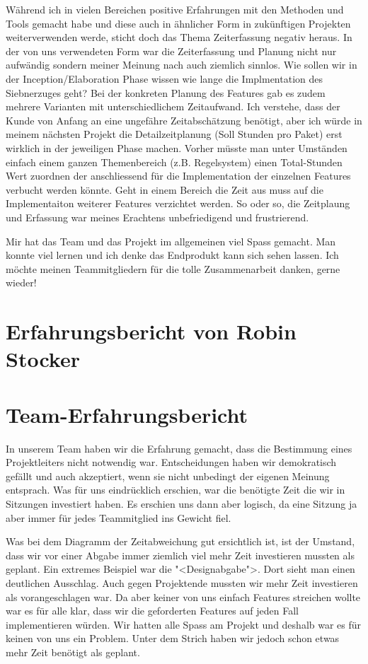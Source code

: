 \documentclass[12pt,halfparskip]{scrartcl}
\begin{document}
Während ich in vielen Bereichen positive Erfahrungen mit den Methoden und Tools gemacht habe und diese auch in ähnlicher Form in zukünftigen Projekten weiterverwenden werde, sticht doch das Thema Zeiterfassung negativ heraus. In der von uns verwendeten Form war die Zeiterfassung und Planung nicht nur aufwändig sondern meiner Meinung nach auch ziemlich sinnlos. Wie sollen wir in der Inception/Elaboration Phase wissen wie lange die Implmentation des Siebnerzuges geht? Bei der konkreten Planung des Features gab es zudem mehrere Varianten mit unterschiedlichem Zeitaufwand. Ich verstehe, dass der Kunde von Anfang an eine ungefähre Zeitabschätzung benötigt, aber ich würde in meinem nächsten Projekt die Detailzeitplanung (Soll Stunden pro Paket) erst wirklich in der jeweiligen Phase machen. Vorher müsste man unter Umständen einfach einem ganzen Themenbereich (z.B. Regelsystem) einen Total-Stunden Wert zuordnen der anschliessend für die Implementation der einzelnen Features verbucht werden könnte. Geht in einem Bereich die Zeit aus muss auf die Implementaiton weiterer Features verzichtet werden. So oder so, die Zeitplaung und Erfassung war meines Erachtens unbefriedigend und frustrierend.

Mir hat das Team und das Projekt im allgemeinen viel Spass gemacht. Man konnte viel lernen und ich denke das Endprodukt kann sich sehen lassen. Ich möchte meinen Teammitgliedern für die tolle Zusammenarbeit danken, gerne wieder!

\section{Erfahrungsbericht von Robin Stocker}

\section{Team-Erfahrungsbericht}
In unserem Team haben wir die Erfahrung gemacht, dass die Bestimmung eines Projektleiters nicht notwendig war. Entscheidungen haben wir demokratisch gefällt und auch akzeptiert, wenn sie nicht unbedingt der eigenen Meinung entsprach. Was für uns eindrücklich erschien, war die benötigte Zeit die wir in Sitzungen investiert haben. Es erschien uns dann aber logisch, da eine Sitzung ja aber immer für jedes Teammitglied ins Gewicht fiel.

Was bei dem Diagramm der Zeitabweichung gut ersichtlich ist, ist der Umstand, dass wir vor einer Abgabe immer ziemlich viel mehr Zeit investieren mussten als geplant. Ein extremes Beispiel war die "<Designabgabe">. Dort sieht man einen deutlichen Ausschlag. Auch gegen Projektende mussten wir mehr Zeit investieren als vorangeschlagen war. Da aber keiner von uns einfach Features streichen wollte war es für alle klar, dass wir die geforderten Features auf jeden Fall implementieren würden. Wir hatten alle Spass am Projekt und deshalb war es für keinen von uns ein Problem. Unter dem Strich haben wir jedoch schon etwas mehr Zeit benötigt als geplant.
\end{document}
